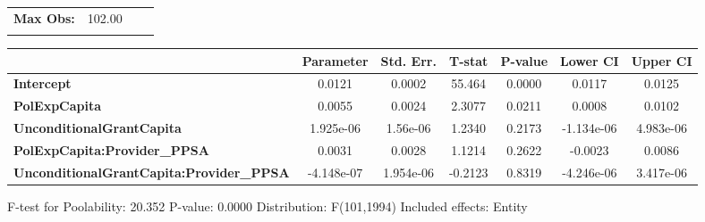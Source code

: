 \begin{center}
\begin{tabular}{lclc}
\textbf{Max Obs:}                                &       102.00       & \textbf{                     }   &                  \\
\textbf{}                                        &                    & \textbf{                     }   &                  \\
\bottomrule
\end{tabular}
\begin{tabular}{lcccccc}
                                                 & \textbf{Parameter} & \textbf{Std. Err.} & \textbf{T-stat} & \textbf{P-value} & \textbf{Lower CI} & \textbf{Upper CI}  \\
\midrule
\textbf{Intercept}                               &       0.0121       &       0.0002       &      55.464     &      0.0000      &       0.0117      &       0.0125       \\
\textbf{PolExpCapita}                            &       0.0055       &       0.0024       &      2.3077     &      0.0211      &       0.0008      &       0.0102       \\
\textbf{UnconditionalGrantCapita}                &     1.925e-06      &      1.56e-06      &      1.2340     &      0.2173      &     -1.134e-06    &     4.983e-06      \\
\textbf{PolExpCapita:Provider\_PPSA}             &       0.0031       &       0.0028       &      1.1214     &      0.2622      &      -0.0023      &       0.0086       \\
\textbf{UnconditionalGrantCapita:Provider\_PPSA} &     -4.148e-07     &     1.954e-06      &     -0.2123     &      0.8319      &     -4.246e-06    &     3.417e-06      \\
\bottomrule
\end{tabular}
\end{center}

F-test for Poolability: 20.352 \newline
 P-value: 0.0000 \newline
 Distribution: F(101,1994) \newline
  \newline
 Included effects: Entity